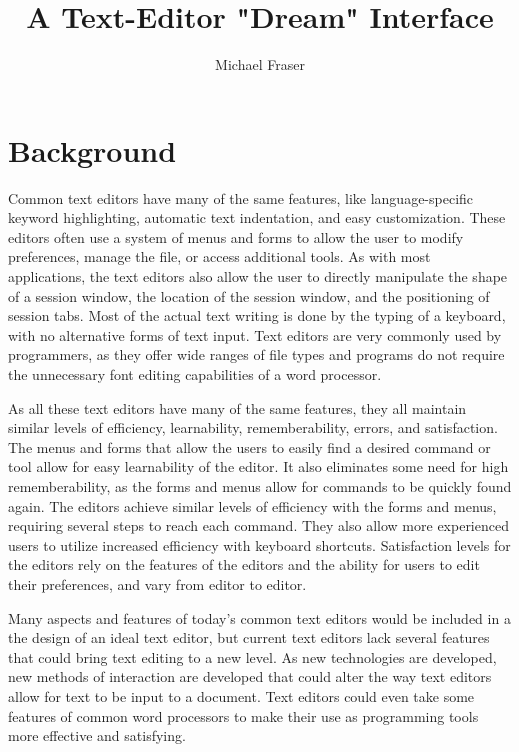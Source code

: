 \documentclass[11pt, oneside]{article}
\begin{document}
\title{A Text-Editor "Dream" Interface}
\author{Michael Fraser}
\maketitle

\tableofcontents

\section{Background}
Common text editors have many of the same features, like language-specific keyword highlighting, automatic text indentation, and easy customization. These editors often use a system of menus and forms to allow the user to modify preferences, manage the file, or access additional tools. As with most applications, the text editors also allow the user to directly manipulate the shape of a session window, the location of the session window, and the positioning of session tabs. Most of the actual text writing is done by the typing of a keyboard, with no alternative forms of text input. Text editors are very commonly used by programmers, as they offer wide ranges of file types and programs do not require the unnecessary font editing capabilities of a word processor.

As all these text editors have many of the same features, they all maintain similar levels of efficiency, learnability, rememberability, errors, and satisfaction. The menus and forms that allow the users to easily find a desired command or tool allow for easy learnability of the editor. It also eliminates some need for high rememberability, as the forms and menus allow for commands to be quickly found again. The editors achieve similar levels of efficiency with the forms and menus, requiring several steps to reach each command. They also allow more experienced users to utilize increased efficiency with keyboard shortcuts. Satisfaction levels for the editors rely on the features of the editors and the ability for users to edit their preferences, and vary from editor to editor. %

Many aspects and features of today's common text editors would be included in a the design of an ideal text editor, but current text editors lack several features that could bring text editing to a new level. As new technologies are developed, new methods of interaction are developed that could alter the way text editors allow for text to be input to a document. Text editors could even take some features of common word processors to make their use as programming tools more effective and satisfying. 
\end{document}
